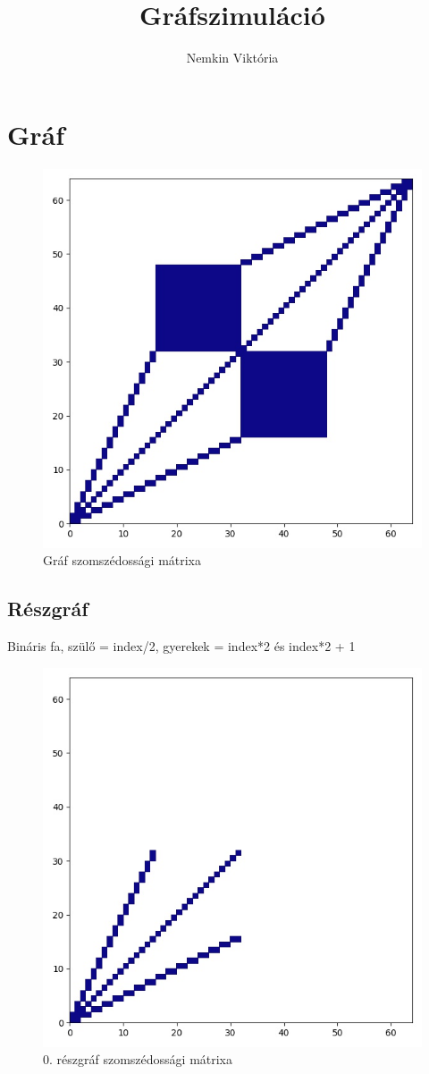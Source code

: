 \documentclass[14pt,a4paper]{article}
\title{Gráfszimuláció}
\author{Nemkin Viktória}
\date{}
\begin{document}
\maketitle
\section{Gráf}
\begin{figure}[H]
\centering
\includegraphics[width = 0.7\columnwidth]{graph.jpg}
\caption{Gráf szomszédossági mátrixa}
\end{figure}
\subsection{Részgráf}
Bináris fa, szülő = index/2, gyerekek = index*2 és index*2 + 1
\begin{figure}[H]
\centering
\includegraphics[width = 0.7\columnwidth]{subgraph_00.jpg}
\caption{0. részgráf szomszédossági mátrixa}
\end{figure}
\end{document}
